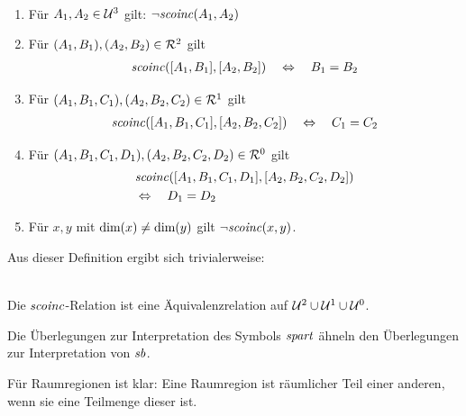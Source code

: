        \begin{dfn}\ \vspace{0pt}

            \begin{enumerate}
                \item Für $A_1, A_2 \in \mathcal{U}^3$ gilt: $\neg \mathit{scoinc}(A_1,A_2)$
                \item Für $(A_1,B_1), (A_2,B_2) \in \mathcal{R}^2$ gilt 
                    \begin{align*}
                        \mathit{scoinc}([A_1,B_1],[A_2,B_2]) \quad \Leftrightarrow  \quad B_1 = B_2
                    \end{align*}
                \item Für $(A_1,B_1,C_1), (A_2,B_2,C_2) \in \mathcal{R}^1$ gilt 
                    \begin{align*}
                        \mathit{scoinc}([A_1,B_1,C_1],[A_2,B_2,C_2]) \quad \Leftrightarrow  \quad C_1 = C_2
                    \end{align*}
                \item Für $(A_1,B_1,C_1,D_1), (A_2,B_2,C_2,D_2) \in \mathcal{R}^0$ gilt 
                    \begin{align*}
                        &\mathit{scoinc}([A_1,B_1,C_1,D_1],[A_2,B_2,C_2,D_2]) \\
                        &\Leftrightarrow  \quad D_1 = D_2
                    \end{align*}
                \item Für $x, y$ mit $\text{dim}(x) \neq \text{dim}(y)$ gilt $\neg \mathit{scoinc}(x,y)$.
            \end{enumerate}
            
        \end{dfn}%
%        
        Aus dieser Definition ergibt sich trivialerweise:
        
        \begin{satz}\ \\
            Die $\mathit{scoinc}$-Relation ist eine Äquivalenzrelation auf $\mathcal{U}^2 \cup \mathcal{U}^1 \cup \mathcal{U}^0$.
        \end{satz}
    
        Die Überlegungen zur Interpretation des Symbols $\mathit{spart}$ ähneln den Überlegungen zur Interpretation von $\mathit{sb}$.
    
        Für Raumregionen ist klar: Eine Raumregion ist räumlicher Teil einer anderen, wenn sie eine Teilmenge dieser ist.
    
